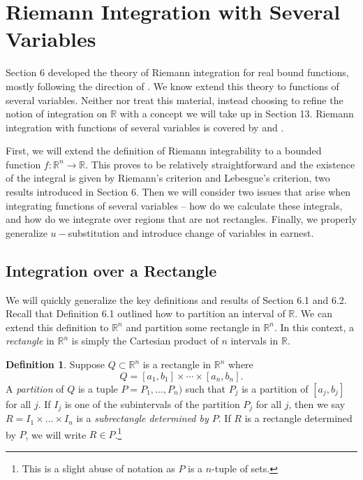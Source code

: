 \documentclass{article}
\newcommand{\R}{\mathbb{R}}
\theoremstyle{definition}
\newtheorem{definition}{Definition}[section]
\begin{document}
	\section{Riemann Integration with Several Variables}
	Section 6 developed the theory of Riemann integration for real bound functions, mostly following the direction of \cite{rudin1964principles}. We know extend this theory to functions of several variables. Neither \cite{rudin1964principles} nor \citet{tao2006analysis,tao2009analysis} treat this material, instead choosing to refine the notion of integration on $ \R $ with a concept we will take up in Section 13. Riemann integration with functions of several variables is covered by \cite{apostol} and \cite{munk1}. 
	
	First, we will extend the definition of Riemann integrability to a bounded function $ f:\R^n\to\R $. This proves to be relatively straightforward and the existence of the integral is given by Riemann's criterion and Lebesgue's criterion, two results introduced in Section 6. Then we will consider two issues that arise when integrating functions of several variables -- how do we calculate these integrals, and how do we integrate over regions that are not rectangles. Finally, we properly generalize $ u -$substitution and introduce change of variables in earnest. 
	
	\subsection{Integration over a Rectangle}
	We will quickly generalize the key definitions and results of Section 6.1 and 6.2. Recall that Definition 6.1 outlined how to partition an interval of $ \R $. We can extend this definition to $ \R^n $ and partition some rectangle in $ \R^n $. In this context, a \textit{\color{red}rectangle} in $ \R^n $ is simply the Cartesian product of $ n $ intervals in $ \R $. 
	\begin{definition}
		Suppose $ Q\subset \R^n $ is a rectangle in $ \R^n $ where 
		$$ Q = [a_1,b_1]\times \cdots \times [a_n,b_n].$$
		A \textit{\color{red}partition} of $ Q $ is a tuple $ P=P_1,\ldots,P_n) $ such that $ P_j $ is a partition of $ [a_j,b_j] $ for all $ j $. If $ I_j $ is one of the subintervals of the partition $ P_j $ for all $ j $, then we say $ R = I_1\times \ldots \times I_n $ is a \textit{\color{red}subrectangle determined by $ P $}. If $ R $ is a rectangle determined by $ P $, we will write $ R\in P $.\footnote{This is a slight abuse of notation as $ P $ is a $ n $-tuple of sets.}
	\end{definition}
	
\end{document}
